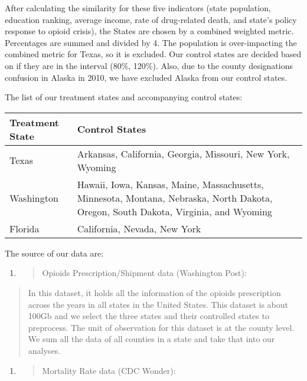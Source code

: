 \documentclass{article}
\begin{document}
After calculating the similarity for these five indicators (state
population, education ranking, average income, rate of drug-related
death, and state's policy response to opioid crisis), the States are
chosen by a combined weighted metric. Percentages are summed and divided
by 4. The population is over-impacting the combined metric for Texas, so
it is excluded. Our control states are decided based on if they are in
the interval (80\%, 120\%). Also, due to the county designations
confusion in Alaska in 2010, we have excluded Alaska from our control
states.

The list of our treatment states and accompanying control states:

\begin{longtable}[]{@{}ll@{}}
\toprule
Treatment State & Control States\tabularnewline
\midrule
\endhead
Texas & Arkansas, California, Georgia, Missouri, New York,
Wyoming\tabularnewline
Washington & Hawaii, Iowa, Kansas, Maine, Massachusetts, Minnesota,
Montana, Nebraska, North Dakota, Oregon, South Dakota, Virginia, and
Wyoming\tabularnewline
Florida & California, Nevada, New York\tabularnewline
\bottomrule
\end{longtable}

The source of our data are:

\begin{enumerate}
\def\labelenumi{\arabic{enumi}.}
\item
  \begin{quote}
  Opioids Prescription/Shipment data (Washington Post):
  \end{quote}
\end{enumerate}

\begin{quote}
In this dataset, it holds all the information of the opioids
prescription across the years in all states in the United States. This
dataset is about 100Gb and we select the three states and their
controlled states to preprocess. The unit of observation for this
dataset is at the county level. We sum all the data of all counties in a
state and take that into our analyses.
\end{quote}

\begin{enumerate}
\def\labelenumi{\arabic{enumi}.}
\setcounter{enumi}{1}
\item
  \begin{quote}
  Mortality Rate data (CDC Wonder):
  \end{quote}
\end{enumerate}
\end{document}
